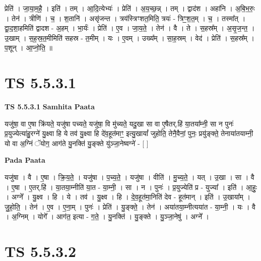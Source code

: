\documentclass[17pt]{extarticle}
\begin{document}
प्रेति॑ । जा॒या॒म॒है॒ । इति॑ । तम् । आ॒दि॒त्येभ्यः॑ । प्रेति॑ । अ॒य॒च्छ॒न्न् । तम् । द्वाद॑श । अहा॑नि । अ॒बि॒भ॒रुः॒ । तेन॑ । त्रीणि॑ । च॒ । श॒तानि॑ । असृ॑जन्त । त्रय॑स्त्रिꣳशत॒मिति॒ त्रयः॑ - त्रिꣳ॒॒श॒त॒म् । च॒ । तस्मा᳚त् । द्वा॒द॒शा॒हमिति॑ द्वादश - अ॒हम् । भा॒र्यः॑ । प्रेति॑ । ए॒व । जा॒य॒ते॒ । तेन॑ । वै । ते । स॒हस्र᳚म् । अ॒सृ॒ज॒न्त॒ । उ॒खाम् । स॒ह॒स्र॒त॒मीमिति॑ सहस्र - त॒मीम् । यः । ए॒वम् । उख्य᳚म् । सा॒ह॒स्रम् । वेद॑ । प्रेति॑ । स॒हस्र᳚म् । प॒शून् । आ॒प्नो॒ति॒ ॥  \newline





\section{ TS 5.5.3.1 }

\textbf{TS 5.5.3.1 } \newline
\textbf{Samhita Paata} \newline

यजु॑षा॒ वा ए॒षा क्रि॑यते॒ यजु॑षा पच्यते॒ यजु॑षा॒ वि मु॑च्यते॒ यदु॒खा सा वा ए॒षैतर्.हि॑ या॒तया᳚म्नी॒ सा न पुनः॑ प्र॒युज्येत्या॑हु॒रग्ने॑ यु॒क्ष्वा हि ये तव॑ यु॒क्ष्वा हि दे॑व॒हूत॑माꣳ॒॒ इत्यु॒खायां᳚ जुहोति॒ तेनै॒वैनां॒ पुनः॒ प्रयु॑ङ्क्ते॒ तेनाया॑तयाम्नी॒ यो वा अ॒ग्निं ॅयोग॒ आग॑ते यु॒नक्ति॑ यु॒ङ्क्ते यु॑ञ्जा॒नेष्वग्ने॑ - [  ] \newline

\textbf{Pada Paata} \newline

यजु॑षा । वै । ए॒षा । क्रि॒य॒ते॒ । यजु॑षा । प॒च्य॒ते॒ । यजु॑षा । वीति॑ । मु॒च्य॒ते॒ । यत् । उ॒खा । सा । वै । ए॒षा । ए॒तर्.हि॑ । या॒तया॒म्नीति॑ या॒त - या॒म्नी॒ । सा । न । पुनः॑ । प्र॒युज्येति॑ प्र - युज्या᳚ । इति॑ । आ॒हुः॒ । अग्ने᳚ । यु॒क्ष्व । हि । ये । तव॑ । यु॒क्ष्व । हि । दे॒व॒हूत॑मा॒निति॑ देव - हूत॑मान् । इति॑ । उ॒खाया᳚म् । जु॒हो॒ति॒ । तेन॑ । ए॒व । ए॒ना॒म् । पुनः॑ । प्रेति॑ । यु॒ङ्क्ते॒ । तेन॑ । अया॑तया॒म्नीत्यया॑त - या॒म्नी॒ । यः । वै । अ॒ग्निम् । योगे᳚ । आग॑त॒ इत्या - ग॒ते॒ । यु॒नक्ति॑ । यु॒ङ्क्ते । यु॒ञ्जा॒नेषु॑ । अग्ने᳚ ।  \newline





\section{ TS 5.5.3.2 }
\end{document}

